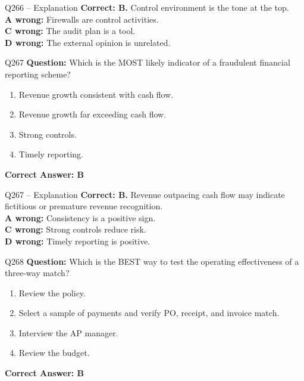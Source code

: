 \documentclass[aspectratio=169,10pt]{beamer}
\begin{document}
	\begin{frame}[t]{Q266 -- Explanation}
		\small
		\textbf{Correct: B.} Control environment is the tone at the top. \\[4pt]
		\textbf{A wrong:} Firewalls are control activities. \\[2pt]
		\textbf{C wrong:} The audit plan is a tool. \\[2pt]
		\textbf{D wrong:} The external opinion is unrelated.
	\end{frame}
	
	\begin{frame}[t]{Q267}
		\small
		\textbf{Question:} Which is the MOST likely indicator of a fraudulent financial reporting scheme?
		\begin{enumerate}[label=\Alph*.,itemsep=1pt,topsep=2pt]
			\item Revenue growth consistent with cash flow.
			\item Revenue growth far exceeding cash flow.
			\item Strong controls.
			\item Timely reporting.
		\end{enumerate}
		\vspace{4pt}
		\textbf{Correct Answer: B}
	\end{frame}
	
	\begin{frame}[t]{Q267 -- Explanation}
		\small
		\textbf{Correct: B.} Revenue outpacing cash flow may indicate fictitious or premature revenue recognition. \\[4pt]
		\textbf{A wrong:} Consistency is a positive sign. \\[2pt]
		\textbf{C wrong:} Strong controls reduce risk. \\[2pt]
		\textbf{D wrong:} Timely reporting is positive.
	\end{frame}
	
	\begin{frame}[t]{Q268}
		\small
		\textbf{Question:} Which is the BEST way to test the operating effectiveness of a three-way match?
		\begin{enumerate}[label=\Alph*.,itemsep=1pt,topsep=2pt]
			\item Review the policy.
			\item Select a sample of payments and verify PO, receipt, and invoice match.
			\item Interview the AP manager.
			\item Review the budget.
		\end{enumerate}
		\vspace{4pt}
		\textbf{Correct Answer: B}
	\end{frame}
	
\end{document}
